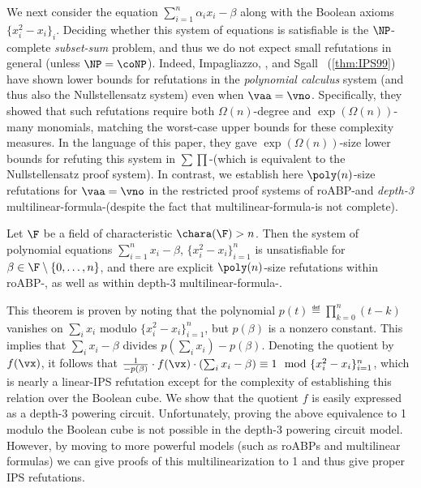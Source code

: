 \documentclass{toc}
\begin{document}
We next consider the equation $\sum_{i=1}^n \alpha_i x_i-\beta$ along with the Boolean axioms $\{x_i^2-x_i\}_i$.  Deciding whether this system of equations is satisfiable is the $\NP$-complete \emph{subset-sum} problem, and
thus %
we do not expect small refutations in general (unless $\NP=\coNP$). Indeed, Impagliazzo, \Pudlak, and Sgall~\cite{IPS99} (\autoref{thm:IPS99}) have shown lower bounds for refutations in the \emph{polynomial calculus} system (and thus also the Nullstellensatz system) even when $\vaa=\vno$. Specifically, they showed that such refutations require both $\Omega(n)$-degree and $\exp(\Omega(n))$-many monomials, matching the worst-case upper bounds for these complexity measures.  In the language of this paper, they gave $\exp(\Omega(n))$-size lower bounds for refuting this system in $\sum\prod$-\lIPS (which is equivalent to the Nullstellensatz proof system).  In contrast, we establish here $\poly(n)$-size refutations for $\vaa=\vno$ in the restricted proof systems of roABP-\lIPS and \emph{depth-3} multilinear-formula-\lIPS (despite the fact that multilinear-formula-\lIPS is not complete).

\begin{theorem}
        Let $\F$ be a field of characteristic $\chara(\F)>n$. Then the system of polynomial equations $\sum_{i=1}^n x_i-\beta$, $\{x_i^2-x_i\}_{i=1}^n$ is unsatisfiable for $\beta\in\F\setminus\{0,\ldots,n\}$, and there are explicit $\poly(n)$-size refutations within roABP-\lIPS, as well as within depth-3 multilinear-formula-\lIPS.
\end{theorem}

This theorem is proven by noting that the polynomial $p(t)\eqdef\prod_{k=0}^n (t-k)$ vanishes on $\sum_i x_i$ modulo $\{x_i^2-x_i\}_{i=1}^n$, but $p(\beta)$ is a nonzero constant.  This implies that $\sum_i x_i-\beta$ divides $p(\sum_i x_i)-p(\beta)$.  Denoting the quotient by $f(\vx)$, it follows that $\frac{1}{-p(\beta)}\cdot f(\vx)\cdot (\sum_i x_i-\beta)\equiv 1\mod \{x_i^2-x_i\}_{i=1}^n$, which is nearly a linear-IPS refutation except for the complexity of establishing this relation over the Boolean cube.  We show that the quotient $f$ is easily expressed as a depth-3 powering circuit.  Unfortunately, proving the above equivalence to 1 modulo the Boolean cube is not possible in the depth-3 powering circuit model.  However, by moving to more powerful models (such as roABPs and multilinear formulas) we can give proofs of this multilinearization to 1 and thus give proper IPS refutations.
\end{document}
